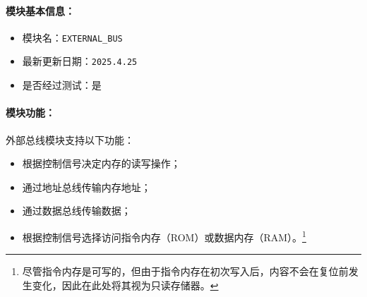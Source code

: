 \documentclass[lang=cn,a4paper,newtx]{elegantpaper}
\begin{document}
\paragraph{模块基本信息：}
\begin{itemize}
  \item 模块名：\texttt{EXTERNAL\_BUS}
  \item 最新更新日期：\texttt{2025.4.25}
  \item 是否经过测试：是
\end{itemize}

\paragraph{模块功能：}
外部总线模块支持以下功能：
\begin{itemize}
  \item 根据控制信号决定内存的读写操作；
  \item 通过地址总线传输内存地址；
  \item 通过数据总线传输数据；
  \item 根据控制信号选择访问指令内存（ROM）或数据内存（RAM）。\footnote{尽管指令内存是可写的，但由于指令内存在初次写入后，内容不会在复位前发生变化，因此在此处将其视为只读存储器。}
\end{itemize}
\end{document}

